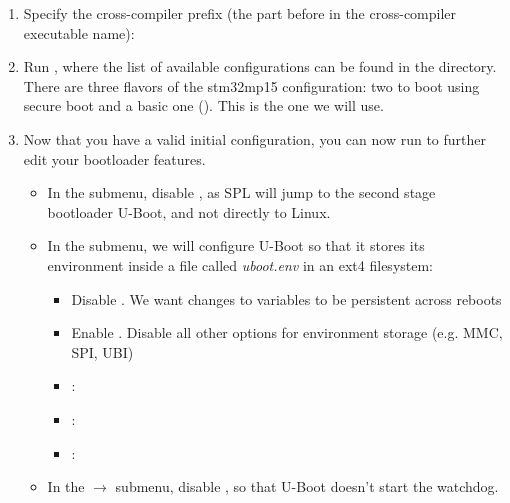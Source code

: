 \begin{enumerate}

\item Specify the cross-compiler prefix
(the part before  in the cross-compiler executable name):

\item Run , where the list of available
  configurations can be found in the  directory. There
  are three flavors of the stm32mp15 configuration: two to boot using
  secure boot and a basic one (). This is the
  one we will use.

\item Now that you have a valid initial configuration, you can now
  run  to further edit your bootloader features.
  \begin{itemize}

  \item In the  submenu, disable , as
     SPL will jump to the second stage bootloader U-Boot, and not directly to Linux.

  \item In the  submenu, we will configure U-Boot so
    that it stores its environment inside a file called {\em
      uboot.env} in an ext4 filesystem:
    \begin{itemize}
    \item Disable . We want changes to variables to
        be persistent across reboots
    \item Enable . Disable all other
        options for environment storage (e.g. MMC, SPI, UBI)
    \item {}: 
    \item {}: 
    \item {}: 
    \end{itemize}

  \item In the  $\rightarrow$  submenu, disable , so that U-Boot doesn't start the
    watchdog.
  \end{itemize}


\end{enumerate}
